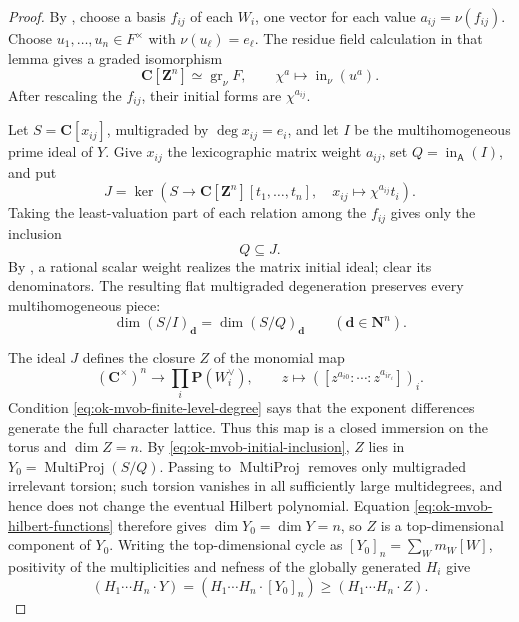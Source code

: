 \begin{proof}
By , choose a basis $f_{ij}$ of each
$W_i$, one vector for each value $a_{ij}=\nu(f_{ij})$.  Choose
$u_1,\ldots,u_n\in F^\times$ with $\nu(u_\ell)=e_\ell$.  The residue
field calculation in that lemma gives a graded isomorphism
\[
 \mathbf C[\mathbf Z^n]\simeq\operatorname{gr}_\nu F,
 \qquad \chi^a\longmapsto\operatorname{in}_\nu(u^a).
\]
After rescaling the $f_{ij}$, their initial forms are $\chi^{a_{ij}}$.

Let $S=\mathbf C[x_{ij}]$, multigraded by $\deg x_{ij}=e_i$, and let
$I$ be the multihomogeneous prime ideal of $Y$.  Give $x_{ij}$ the
lexicographic matrix weight $a_{ij}$, set
$Q=\operatorname{in}_{\mathsf A}(I)$, and put
\[
 J=\ker\!\left(S\longrightarrow
 \mathbf C[\mathbf Z^n][t_1,\ldots,t_n],\quad
 x_{ij}\longmapsto\chi^{a_{ij}}t_i\right).
\]
Taking the least-valuation part of each relation among the $f_{ij}$ gives
only the inclusion
\[
                              Q\subseteq J.
\tag{55.33}\label{eq:ok-mvob-initial-inclusion}
\]
By \cite[Proposition~8.10]{KM19}, a rational scalar weight realizes the
matrix initial ideal; clear its denominators.  The resulting flat
multigraded degeneration preserves every multihomogeneous piece:
\[
 \dim(S/I)_{\mathbf d}=\dim(S/Q)_{\mathbf d}
 \qquad(\mathbf d\in\mathbf N^n).
\tag{55.34}\label{eq:ok-mvob-hilbert-functions}
\]

The ideal $J$ defines the closure $Z$ of the monomial map
\[
 (\mathbf C^\times)^n\longrightarrow
 \prod_i\mathbf P(W_i^\vee),\qquad
 z\longmapsto([z^{a_{i0}}:\cdots:z^{a_{ir_i}}])_i.
\]
Condition \eqref{eq:ok-mvob-finite-level-degree} says that the exponent
differences generate the full character lattice.  Thus this map is a
closed immersion on the torus and $\dim Z=n$.  By
\eqref{eq:ok-mvob-initial-inclusion}, $Z$ lies in
$Y_0=\operatorname{MultiProj}(S/Q)$.  Passing to
$\operatorname{MultiProj}$ removes only multigraded irrelevant torsion;
such torsion vanishes in all sufficiently large multidegrees, and hence
does not change the eventual Hilbert polynomial.  Equation
\eqref{eq:ok-mvob-hilbert-functions} therefore gives
$\dim Y_0=\dim Y=n$, so $Z$ is a top-dimensional component of $Y_0$.
Writing the top-dimensional cycle as
$[Y_0]_n=\sum_Wm_W[W]$, positivity of the multiplicities and nefness of
the globally generated $H_i$ give
\[
 (H_1\cdots H_n\cdot Y)
 =(H_1\cdots H_n\cdot[Y_0]_n)
 \geq(H_1\cdots H_n\cdot Z).
\tag{55.35}\label{eq:ok-mvob-toric-component}
\]


\end{proof}
